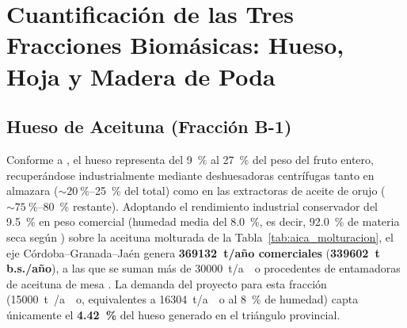 \documentclass{report}
\begin{document}
\section{Cuantificación de las Tres Fracciones Biomásicas: Hueso, Hoja y Madera de Poda}

\subsection{Hueso de Aceituna (Fracción B-1)}
Conforme a \textcite[Secciones~1--2]{ElFessikh2025}, el hueso representa del \SI{9}{\percent} al \SI{27}{\percent} del peso del fruto entero, recuperándose industrialmente mediante deshuesadoras centrífugas tanto en almazara ($\sim \SI{20}{\percent}$--\SI{25}{\percent} del total) como en las extractoras de aceite de orujo ($\sim \SI{75}{\percent}$--\SI{80}{\percent} restante). Adoptando el rendimiento industrial conservador del \SI{9.5}{\percent} en peso comercial (humedad media del \SI{8.0}{\percent}, es decir, \SI{92.0}{\percent} de materia seca según \textcite[Sección~2.1]{RomeroGarcia2022}) sobre la aceituna molturada de la Tabla~\ref{tab:aica_molturacion}, el eje Córdoba--Granada--Jaén genera \textbf{\num{369132}~t/año comerciales} (\textbf{\num{339602}~t b.s./año}), a las que se suman más de \SI{30000}{\tonne/ao} procedentes de entamadoras de aceituna de mesa \autocite{AICA2026}. La demanda del proyecto para esta fracción (\SI{15000}{\tonne{}/ao}, equivalentes a \SI{16304}{\tonne/ao} al \SI{8}{\percent} de humedad) capta únicamente el \textbf{\SI{4.42}{\percent}} del hueso generado en el triángulo provincial.
\end{document}
